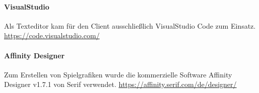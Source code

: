 	\paragraph{VisualStudio}
Als Texteditor kam für den Client ausschließlich VisualStudio Code zum Einsatz. \url{https://code.visualstudio.com/}

	\paragraph{Affinity Designer}
Zum Erstellen von Spielgrafiken wurde die kommerzielle Software Affinity Designer v1.7.1 von Serif verwendet. \url{https://affinity.serif.com/de/designer/}



